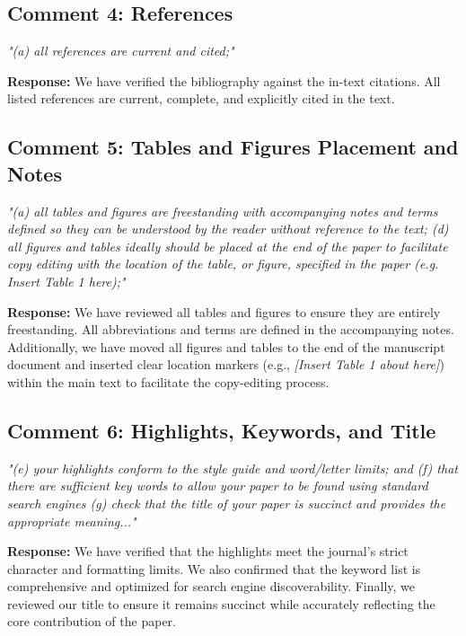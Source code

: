 \documentclass[12pt]{article}
\begin{document}
\subsection*{Comment 4: References}
\textit{"(a) all references are current and cited;"}

\begin{highlightbox}
\textbf{Response:} We have verified the bibliography against the in-text citations. All listed references are current, complete, and explicitly cited in the text.
\end{highlightbox}

\subsection*{Comment 5: Tables and Figures Placement and Notes}
\textit{"(a) all tables and figures are freestanding with accompanying notes and terms defined so they can be understood by the reader without reference to the text; (d) all figures and tables ideally should be placed at the end of the paper to facilitate copy editing with the location of the table, or figure, specified in the paper (e.g. Insert Table 1 here);"}

\begin{highlightbox}
\textbf{Response:} We have reviewed all tables and figures to ensure they are entirely freestanding. All abbreviations and terms are defined in the accompanying notes. Additionally, we have moved all figures and tables to the end of the manuscript document and inserted clear location markers (e.g., \textit{[Insert Table 1 about here]}) within the main text to facilitate the copy-editing process.
\end{highlightbox}

\subsection*{Comment 6: Highlights, Keywords, and Title}
\textit{"(e) your highlights conform to the style guide and word/letter limits; and (f) that there are sufficient key words to allow your paper to be found using standard search engines (g) check that the title of your paper is succinct and provides the appropriate meaning..."}

\begin{highlightbox}
\textbf{Response:} We have verified that the highlights meet the journal's strict character and formatting limits. We also confirmed that the keyword list is comprehensive and optimized for search engine discoverability. Finally, we reviewed our title to ensure it remains succinct while accurately reflecting the core contribution of the paper.
\end{highlightbox}
\end{document}
